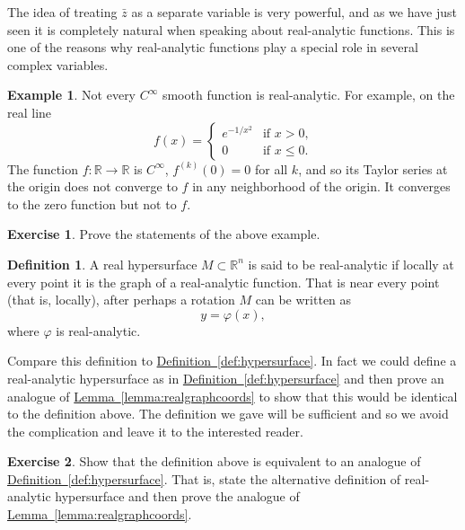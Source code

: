 \documentclass[12pt,openany]{book}
\newcommand{\R}{{\mathbb{R}}}
\theoremstyle{plain}
\theoremstyle{remark}
\theoremstyle{definition}
\newtheorem{defn}[thm]{Definition}
\newenvironment{exbox}{%
    \def\FrameCommand{\vrule width 1pt \relax\hspace {10pt}}%
    \MakeFramed {\advance \hsize -\width \FrameRestore }%
}{%
    \endMakeFramed
}
\theoremstyle{exercise}
\newtheorem{exercise}{Exercise}[section]
\theoremstyle{example}
\newtheorem{example}[thm]{Example}
\newcommand{\lemmaref}[1]{\hyperref[#1]{Lemma~\ref*{#1}}}
\newcommand{\defnref}[1]{\hyperref[#1]{Definition~\ref*{#1}}}
\begin{document}
The idea of treating $\bar{z}$ as a separate variable is very powerful, and
as we have just seen it is completely natural when speaking about
real-analytic functions.  This is one of the reasons why real-analytic
functions play a special role in several complex variables.

\begin{example}
Not every $C^\infty$ smooth function is real-analytic.  For example,
on the real line
\begin{equation*}
f(x) =
\begin{cases}
e^{-1/x^2} & \text{if $x > 0$,} \\
0 & \text{if $x \leq 0$.}
\end{cases}
\end{equation*}
The function
$f \colon \R \to \R$ is $C^\infty$, $f^{(k)}(0) = 0$ for all $k$, and so its Taylor series at the origin does
not converge to $f$ in any neighborhood of the origin.  It converges to the
zero function but not to $f$.
\end{example}

\begin{exbox}
\begin{exercise}
Prove the statements of the above example.
\end{exercise}
\end{exbox}

\begin{defn}
A real hypersurface $M \subset \R^n$ is said to be real-analytic
if locally at every point it is the graph of a real-analytic function.  That
is near every point (that is, locally), after perhaps a rotation $M$ can be written as
\begin{equation*}
y = \varphi(x) ,
\end{equation*}
where $\varphi$ is real-analytic.
\end{defn}

Compare this definition to \defnref{def:hypersurface}.  In fact we could
define a real-analytic hypersurface as in 
\defnref{def:hypersurface} and then prove an analogue of
\lemmaref{lemma:realgraphcoords} to show that this would be identical to the
definition above.  The definition we gave will be sufficient and so we avoid
the complication and leave it to the interested reader.

\begin{exbox}
\begin{exercise}
Show that the definition above is equivalent to an analogue of
\defnref{def:hypersurface}.  That is, state the alternative definition of
real-analytic hypersurface and then prove the analogue of 
\lemmaref{lemma:realgraphcoords}.
\end{exercise}
\end{exbox}
\end{document}
